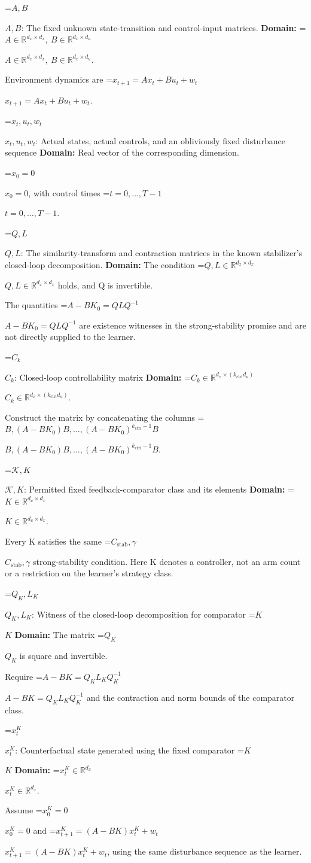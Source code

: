 \documentclass[10pt,a4paper]{article}
\newcommand{\AtlasMath}[1]{\par\begingroup\centering\setbox0=\hbox{$\displaystyle #1$}\ifdim\wd0>1.4\linewidth\typeout{ATLAS WIDE FORMULA: \the\wd0}\fi\ifdim\wd0>\linewidth\resizebox{\linewidth}{!}{\box0}\else\box0\fi\par\endgroup}
\newcommand{\AtlasInlineMath}[1]{\begingroup\setbox0=\hbox{$#1$}\ifdim\wd0>.4\linewidth\endgroup\AtlasMath{#1}\else\endgroup$#1$\fi}
\begin{document}
\AtlasInlineMath{A,B}: The fixed unknown state-transition and control-input matrices. \textbf{Domain:} \AtlasInlineMath{A\in\mathbb R^{d_x\times d_x},\ B\in\mathbb R^{d_x\times d_u}}.

Environment dynamics are \AtlasInlineMath{x_{t+1}=Ax_t+Bu_t+w_t}.

\AtlasInlineMath{x_t,u_t,w_t}: Actual states, actual controls, and an obliviously fixed disturbance sequence \textbf{Domain:} Real vector of the corresponding dimension.

\AtlasInlineMath{x_0=0}, with control times \AtlasInlineMath{t=0,\ldots,T-1}.

\AtlasInlineMath{Q,L}: The similarity-transform and contraction matrices in the known stabilizer’s closed-loop decomposition. \textbf{Domain:} The condition \AtlasInlineMath{Q,L\in\mathbb R^{d_x\times d_x}} holds, and Q is invertible.

The quantities \AtlasInlineMath{A-BK_0=QLQ^{-1}} are existence witnesses in the strong-stability promise and are not directly supplied to the learner.

\AtlasInlineMath{C_k}: Closed-loop controllability matrix \textbf{Domain:} \AtlasInlineMath{C_k\in\mathbb R^{d_x\times(k_{\mathrm{ctrl}}d_u)}}.

Construct the matrix by concatenating the columns \AtlasInlineMath{B,(A-BK_0)B,\ldots,(A-BK_0)^{k_{\mathrm{ctrl}}-1}B}.

\AtlasInlineMath{\mathcal K,K}: Permitted fixed feedback-comparator class and its elements \textbf{Domain:} \AtlasInlineMath{K\in\mathbb R^{d_u\times d_x}}.

Every K satisfies the same \AtlasInlineMath{C_{\mathrm{stab}},\gamma} strong-stability condition. Here K denotes a controller, not an arm count or a restriction on the learner's strategy class.

\AtlasInlineMath{Q_K,L_K}: Witness of the closed-loop decomposition for comparator \AtlasInlineMath{K} \textbf{Domain:} The matrix \AtlasInlineMath{Q_K} is square and invertible.

Require \AtlasInlineMath{A-BK=Q_KL_KQ_K^{-1}} and the contraction and norm bounds of the comparator class.

\AtlasInlineMath{x_t^K}: Counterfactual state generated using the fixed comparator \AtlasInlineMath{K} \textbf{Domain:} \AtlasInlineMath{x_t^K\in\mathbb R^{d_x}}.

Assume \AtlasInlineMath{x_0^K=0} and \AtlasInlineMath{x_{t+1}^K=(A-BK)x_t^K+w_t}, using the same disturbance sequence as the learner.
\end{document}
